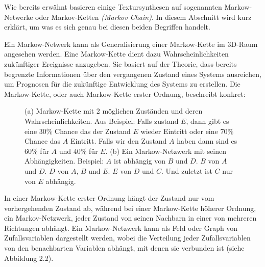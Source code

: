 \documentclass[12pt, a4paper,twoside,openright]{report} %
\begin{document}
Wie bereits erwähnt basieren einige Textursynthesen auf sogenannten Markow-Netwerke oder Markov-Ketten \textit{(Markov Chain)}.
In diesem Abschnitt wird kurz erklärt, um was es sich genau bei diesen beiden Begriffen handelt.\par
Ein Markow-Netwerk kann als Generalisierung einer Markow-Kette im 3D-Raum angesehen werden.
Eine Markow-Kette dient dazu Wahrscheinlichkeiten zukünftiger Ereignisse anzugeben.
Sie basiert auf der Theorie, dass bereits begrenzte Informationen über den vergangenen Zustand eines Systems ausreichen,
um Prognosen für die zukünftige Entwicklung des Systems zu erstellen.
Die Markow-Kette, oder auch Markow-Kette erster Ordnung, beschreibt konkret:
 \cite{wiki:Markow-Kette}

\begin{figure}[H]
    \centering
    \qquad
    \caption{(a) Markow-Kette mit 2 möglichen Zuständen und deren Wahrscheinlichkeiten. Aus \cite{wiki:Markow-Kette}
    Beispiel: Falls zustand $E$, dann gibt es eine $30\%$ Chance das der Zustand $E$ wieder Eintritt oder eine $70\%$ Chance das $A$ Eintritt.
    Falls wir den Zustand $A$ haben dann sind es $60\%$ für $A$ und $40\%$ für $E$. (b) Ein Markow-Netzwerk mit seinen Abhängigkeiten. \cite{wiki:Markov_model}
    Beispiel: $A$ ist abhängig von $B$ und $D$. $B$ von $A$ und $D$. $D$ von $A$, $B$ und $E$. $E$ von $D$ und $C$. Und zuletzt ist $C$ nur von $E$ abhängig.}%
\end{figure}

In einer Markow-Kette erster Ordnung hängt der Zustand nur vom vorhergehenden Zustand ab,
während bei einer Markow-Kette höherer Ordnung, ein Markov-Netzwerk, jeder Zustand von seinen Nachbarn in einer von mehreren Richtungen abhängt. \cite{wiki:Markov_model}
Ein Markow-Netzwerk kann als Feld oder Graph von Zufallsvariablen dargestellt werden,
wobei die Verteilung jeder Zufallsvariablen von den benachbarten Variablen abhängt, mit denen sie verbunden ist {(siehe Abbildung 2.2)}.
\end{document}
